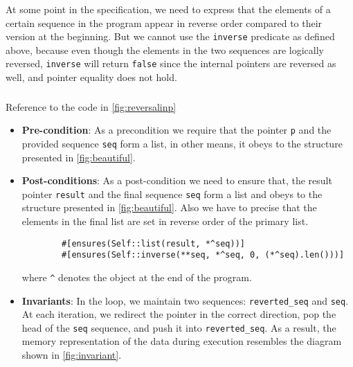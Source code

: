 \documentclass[11pt,a4paper]{article}
\begin{document}
\begin{itemize}
    At some point in the specification, we need to express that the elements of a certain sequence in the program appear in reverse order compared to their version at the beginning. But we cannot use the \texttt{inverse} predicate as defined above, because even though the elements in the two sequences are logically reversed, \texttt{inverse} will return \texttt{false} since the internal pointers are reversed as well, and pointer equality does not hold.
  \end{itemize}
  
\subsubsection{}
Reference to the code in \autoref{fig:reversalinp}
\begin{itemize}
    \item \textbf{Pre-condition}:
    As a precondition we require that the pointer \texttt{p} and the provided sequence \texttt{seq} form a list, in other means, it obeys to the structure presented in \autoref{fig:beautiful}.
    \item \textbf{Post-conditions}:
    As a post-condition we need to ensure that, the result pointer \texttt{result} and the final sequence \texttt{seq} form a list and obeys to the structure presented in \autoref{fig:beautiful}.
    Also we have to precise that the elements in the final list are set in reverse order of the primary list.
    \begin{verbatim}
        #[ensures(Self::list(result, *^seq))]
        #[ensures(Self::inverse(**seq, *^seq, 0, (*^seq).len()))]
    \end{verbatim}
    where \texttt{\^{}} denotes the object at the end of the program.
    \item \textbf{Invariants}:
    In the loop, we maintain two sequences: \texttt{reverted\_seq} and \texttt{seq}. At each iteration, we redirect the pointer in the correct direction, pop the head of the \texttt{seq} sequence, and push it into \texttt{reverted\_seq}. As a result, the memory representation of the data during execution resembles the diagram shown in \autoref{fig:invariant}.

      \begin{figure}[tp]
    \centering
\end{figure}
\end{itemize}
\end{document}
